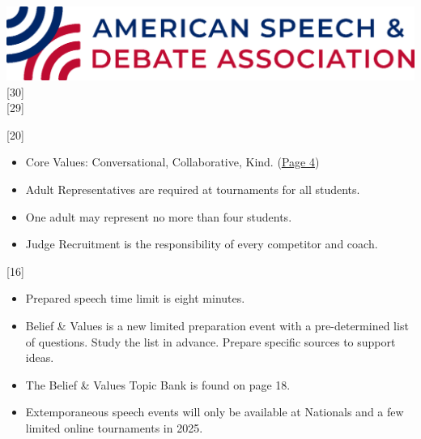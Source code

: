 \documentclass[11pt]{memoir}    %
\def\lowspacing{9pt}
\def\regspacing{19pt}
\def\hispacing{20pt}
\begin{document}
\thispagestyle{CoverStyle}
\addtocounter{page}{-1}

\begin{center}
    \begin{vplace}[0.4]
        \includegraphics[width=0.9815\linewidth,keepaspectratio]{Images/TitlePageLogo.png}\vspace{\hispacing}
        [30]\vspace{\lowspacing}\\
        [29]
    \end{vplace}
\end{center}

\newpage


[20]



\begin{itemize}
    \item Core Values: Conversational, Collaborative, Kind. (\textcolor{blue}{\uline{\hyperref[subsec:CoreValues]{Page 4}}})
    \item Adult Representatives are required at tournaments for all students.
    \item One adult may represent no more than four students.
    \item Judge Recruitment is the responsibility of every competitor and coach.
\end{itemize}\vspace{\regspacing}

\label{subsec:SpeechEventChanges}
\noindent{}[16]

\begin{itemize}
    \item Prepared speech time limit is eight minutes.
    \item Belief \& Values is a new limited preparation event with a pre-determined list of questions. Study the list in advance. Prepare specific sources to support ideas.
    \item The Belief \& Values Topic Bank is found on page 18.
    \item Extemporaneous speech events will only be available at Nationals and a few limited online tournaments in 2025.
\end{itemize}\vspace{\regspacing}
\end{document}
